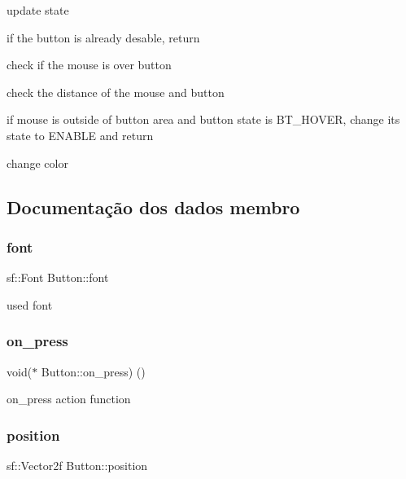 update state 

if the button is already desable, return

check if the mouse is over button

check the distance of the mouse and button

if mouse is outside of button area and button state is B\+T\+\_\+\+H\+O\+V\+ER, change its state to E\+N\+A\+B\+LE and return

change color 

\subsection{Documentação dos dados membro}
\mbox{\label{classButton_ab6290d275363f4b0e133eec450845ca1}} 
\subsubsection{\texorpdfstring{font}{font}}
{\footnotesize\ttfamily sf\+::\+Font Button\+::font\hspace{0.3cm}{\ttfamily [private]}}



used font 

\mbox{\label{classButton_ae9295b79451566476a9d2e563d0e7ce2}} 
\subsubsection{\texorpdfstring{on\+\_\+press}{on\_press}}
{\footnotesize\ttfamily void($\ast$ Button\+::on\+\_\+press) ()\hspace{0.3cm}{\ttfamily [private]}}



on\+\_\+press action function 

\mbox{\label{classButton_afd3823c96d76e1152fda9fc080f45b01}} 
\subsubsection{\texorpdfstring{position}{position}}
{\footnotesize\ttfamily sf\+::\+Vector2f Button\+::position\hspace{0.3cm}{\ttfamily [private]}}



